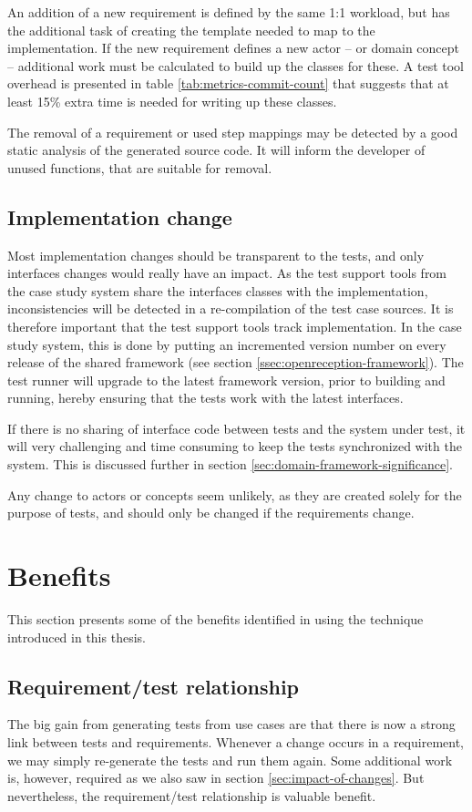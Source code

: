 \noindent An addition of a new requirement is defined by the same 1:1 workload, but has the additional task of creating the template needed to map to the implementation. If the new requirement defines a new actor -- or domain concept -- additional work must be calculated to build up the classes for these. A test tool overhead is presented in table \ref{tab:metrics-commit-count} that suggests that at least 15\% extra time is needed for writing up these classes.\medskip

\noindent The removal of a requirement or used step mappings may be detected by a good static analysis of the generated source code. It will inform the developer of unused functions, that are suitable for removal.

\subsection{Implementation change}
Most implementation changes should be transparent to the tests, and only interfaces changes would really have an impact. As the test support tools from the case study system share the interfaces classes with the implementation, inconsistencies will be detected in a re-compilation of the test case sources. It is therefore important that the test support tools track implementation. In the case study system, this is done by putting an incremented version number on every release of the shared framework (see section \ref{ssec:openreception-framework}). The test runner will upgrade to the latest framework version, prior to building and running, hereby ensuring that the tests work with the latest interfaces.\medskip

\noindent If there is no sharing of interface code between tests and the system under test, it will very challenging and time consuming to keep the tests synchronized with the system. This is discussed further in section \ref{sec:domain-framework-significance}.\medskip

\noindent Any change to actors or concepts seem unlikely, as they are created solely for the purpose of tests, and should only be changed if the requirements change.

\section{Benefits}
This section presents some of the benefits identified in using the technique introduced in this thesis.

\subsection{Requirement/test relationship}
The big gain from generating tests from use cases are that there is now a strong link between tests and requirements. Whenever a change occurs in a requirement, we may simply re-generate the tests and run them again. Some additional work is, however, required as we also saw in section \ref{sec:impact-of-changes}. But nevertheless, the requirement/test relationship is valuable benefit.


